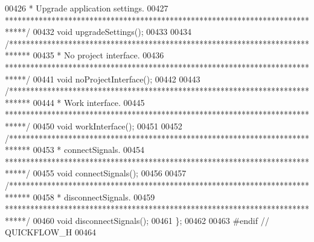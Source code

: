 \begin{DoxyCode}
00426 \textcolor{comment}{  * Upgrade application settings.}
00427 \textcolor{comment}{  *****************************************************************************/}
00432   \textcolor{keywordtype}{void} upgradeSettings();
00433 
00434   \textcolor{comment}{/*****************************************************************************}
00435 \textcolor{comment}{   * No project interface.}
00436 \textcolor{comment}{   *****************************************************************************/}
00441   \textcolor{keywordtype}{void} noProjectInterface();
00442 
00443   \textcolor{comment}{/*****************************************************************************}
00444 \textcolor{comment}{  * Work interface.}
00445 \textcolor{comment}{  *****************************************************************************/}
00450   \textcolor{keywordtype}{void} workInterface();
00451 
00452   \textcolor{comment}{/*****************************************************************************}
00453 \textcolor{comment}{  * connectSignals.}
00454 \textcolor{comment}{  *****************************************************************************/}
00455   \textcolor{keywordtype}{void} connectSignals();
00456 
00457   \textcolor{comment}{/*****************************************************************************}
00458 \textcolor{comment}{  * disconnectSignals.}
00459 \textcolor{comment}{  *****************************************************************************/}
00460   \textcolor{keywordtype}{void} disconnectSignals();
00461 \};
00462 
00463 \textcolor{preprocessor}{#endif  // QUICKFLOW\_H}
00464 
\end{DoxyCode}
